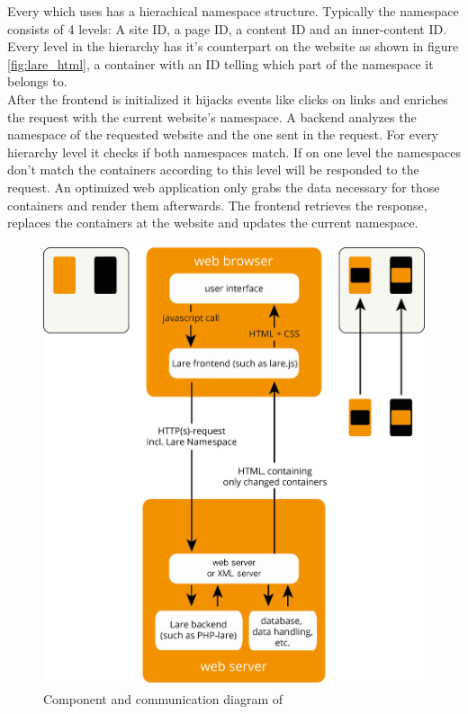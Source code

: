 Every \singlePageApplication{} which uses \lare{} has a hierachical namespace structure.
Typically the namespace consists of 4 levels: A site ID, a page ID, a content ID and an inner-content ID.
Every level in the hierarchy has it's counterpart on the website as shown in figure \ref{fig:lare_html}, a container with an ID telling which part of the namespace it belongs to.
\\
After the \lare{} frontend is initialized it hijacks events like clicks on links and enriches the request with the current website's namespace.
A \lare{} backend analyzes the namespace of the requested website and the one sent in the request.
For every hierarchy level it checks if both namespaces match.
If on one level the namespaces don't match the containers according to this level will be responded to the request.
An optimized web application only grabs the data necessary for those containers and render them afterwards.
The \lare{} frontend retrieves the response, replaces the containers at the website and updates the current namespace.

\begin{figure}[H]
\centering
\includegraphics[height=13cm]{images/lare.png}
\caption[lare_components]{Component and communication diagram of \lare{}}
\label{fig:lare_components}
\end{figure}


